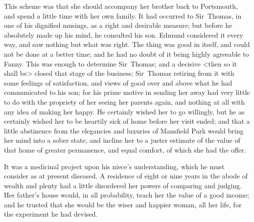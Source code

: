 This scheme was that she should accompany her brother back to Portsmouth, and spend a little time with her own family. It had occurred to Sir~Thomas, in one of his dignified musings, as a right and desirable measure; but before he absolutely made up his mind, he consulted his son. Edmund considered it every way, and saw nothing but what was right. The thing was good in itself, and could not be done at a better time; and he had no doubt of it being highly agreeable to Fanny. This was enough to determine Sir~Thomas; and a decisive <then so it shall be> closed that stage of the business; Sir~Thomas retiring from it with some feelings of satisfaction, and views of good over and above what he had communicated to his son; for his prime motive in sending her away had very little to do with the propriety of her seeing her parents again, and nothing at all with any idea of making her happy. He certainly wished her to go willingly, but he as certainly wished her to be heartily sick of home before her visit ended; and that a little abstinence from the elegancies and luxuries of Mansfield Park would bring her mind into a sober state, and incline her to a juster estimate of the value of that home of greater permanence, and equal comfort, of which she had the offer.

It was a medicinal project upon his niece's understanding, which he must consider as at present diseased. A residence of eight or nine years in the abode of wealth and plenty had a little disordered her powers of comparing and judging. Her father's house would, in all probability, teach her the value of a good income; and he trusted that she would be the wiser and happier woman, all her life, for the experiment he had devised.

